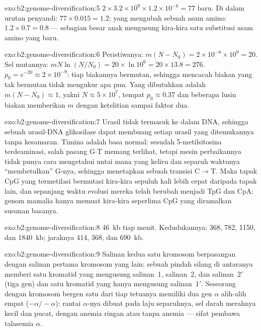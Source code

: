 \begin{solution}{exo:b2:genome-diversification:5}
$2\times 3.2\times 10^{9}\times 1.2\times 10^{-8} = 77$  baru.
Di dalam urutan penyandi: $77\times 0.015 = 1.2$; yang mengubah sebuah
asam amino: $1.2\times 0.7 = 0.8$ --- sebagian besar anak mengusung
kira-kira satu substitusi asam amino yang baru.
\end{solution}

\begin{solution}{exo:b2:genome-diversification:6}
Peristiwanya: $m(N - N_0) = 2\times 10^{-8}\times 10^{9} = 20$. Sel
mutannya: $mN\ln(N/N_0) = 20\times \ln 10^{6} = 20\times 13.8 = 276$.
$p_0 = e^{-20} \approx 2\times 10^{-9}$: tiap biakannya bermutan,
sehingga mencacah biakan yang tak bermutan tidak mengukur apa pun. Yang
dibutuhkan adalah $m(N -
N_0) \approx 1$, yakni $N \approx 5\times 10^{7}$, tempat $p_0 \approx
0.37$ dan beberapa lusin biakan memberikan $m$ dengan ketelitian sampai
faktor dua.
\end{solution}

\begin{solution}{exo:b2:genome-diversification:7}
Urasil tidak termasuk ke dalam DNA, sehingga sebuah urasil-DNA
glikosilase dapat membuang setiap urasil yang ditemukannya tanpa
kesamaran. Timina adalah basa normal: sesudah 5-metilsitosina
terdeaminasi, salah pasang G$\cdot$T memang terlihat, tetapi mesin
perbaikannya tidak punya cara mengetahui untai mana yang keliru dan
separuh waktunya ``membetulkan'' G-nya, sehingga menetapkan sebuah
transisi C$\to$T. Maka tapak CpG yang termetilasi bermutasi kira-kira
sepuluh kali lebih cepat daripada tapak lain, dan sepanjang waktu
evolusi mereka telah berubah menjadi TpG dan CpA: genom mamalia hanya
memuat kira-kira seperlima CpG yang diramalkan susunan basanya.
\end{solution}

\begin{solution}{exo:b2:genome-diversification:8}
\qty{46}{kb} tiap menit. Kedudukannya: 368, 782, 1150, dan
\qty{1840}{kb}; jaraknya 414, 368, dan \qty{690}{kb}.
\end{solution}

\begin{solution}{exo:b2:genome-diversification:9}
Salinan kedua satu kromosom berpasangan dengan salinan pertama kromosom
yang lain; sebuah pindah silang di antaranya memberi satu kromatid yang
mengusung salinan~1, salinan~2, dan salinan~2$'$ (tiga gen) dan satu
kromatid yang hanya mengusung salinan~1$'$. Seseorang dengan kromosom
bergen satu dari tiap tetuanya memiliki dua gen $\alpha$ alih-alih
empat ($-\alpha/-\alpha$): rantai $\alpha$-nya dibuat pada laju
separuhnya, sel darah merahnya kecil dan pucat, dengan anemia ringan
atau tanpa anemia --- sifat pembawa talasemia $\alpha$.
\end{solution}

